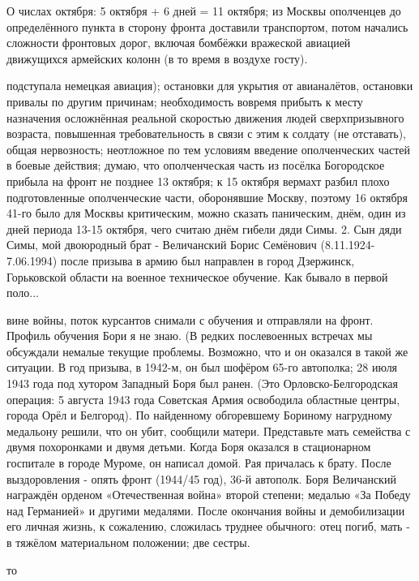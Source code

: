 О числах октября: 5 октября + 6 дней = 11 октября; из Москвы ополченцев до определённого пункта в сторону фронта доставили транспортом, потом начались сложности фронтовых дорог, включая бомбёжки вражеской авиацией движущихся армейских колонн (в то время в воздухе госту).

подступала немецкая авиация); остановки для укрытия от авианалётов, остановки привалы по другим причинам; необходимость вовремя прибыть к месту назначения осложнённая реальной скоростью движения людей сверхпризывного возраста, повышенная требовательность в связи с этим к солдату (не отставать), общая нервозность; неотложное по тем условиям введение ополченческих частей в боевые действия; думаю, что ополченческая часть из посёлка Богородское прибыла на фронт не позднее 13 октября; к 15 октября вермахт разбил плохо подготовленные ополченческие части, оборонявшие Москву, поэтому 16 октября 41-го было для Москвы критическим, можно сказать паническим, днём, один из дней периода 13-15 октября, чего считаю днём гибели дяди Симы. 2. Сын дяди Симы, мой двоюродный брат - Величанский Борис Семёнович (8.11.1924-7.06.1994) после призыва в армию был направлен в город Дзержинск, Горьковской области на военное техническое обучение. Как бывало в первой поло...

вине войны, поток курсантов снимали с обучения и отправляли на фронт. Профиль обучения Бори я не знаю. (В редких послевоенных встречах мы обсуждали немалые текущие проблемы. Возможно, что и он оказался в такой же ситуации. В год призыва, в 1942-м, он был шофёром 65-го автополка; 28 июля 1943 года под хутором Западный Боря был ранен. (Это Орловско-Белгородская операция: 5 августа 1943 года Советская Армия освободила областные центры, города Орёл и Белгород). По найденному обгоревшему Бориному нагрудному медальону решили, что он убит, сообщили матери. Представьте мать семейства с двумя похоронками и двумя детьми. Когда Боря оказался в стационарном госпитале в городе Муроме, он написал домой. Рая причалась к брату. После выздоровления - опять фронт (1944/45 год), 36-й автополк. Боря Величанский награждён орденом «Отечественная война» второй степени; медалью «За Победу над Германией» и другими медалями. После окончания войны и демобилизации его личная жизнь, к сожалению, сложилась труднее обычного: отец погиб, мать - в тяжёлом материальном положении; две сестры.

то

